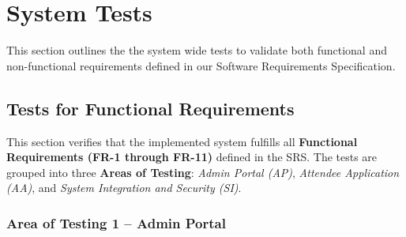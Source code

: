 \documentclass[12pt, titlepage]{article}
\begin{document}
\section{System Tests}

This section outlines the the system wide tests to validate both functional and non-functional requirements defined in our Software Requirements Specification.

\subsection{Tests for Functional Requirements}

This section verifies that the implemented system fulfills all \textbf{Functional Requirements (FR-1 through FR-11)} defined in the SRS.
The tests are grouped into three \textbf{Areas of Testing}: \textit{Admin Portal (AP)}, \textit{Attendee Application (AA)}, and \textit{System Integration and Security (SI)}.
\subsubsection{Area of Testing 1 – Admin Portal}
\end{document}
